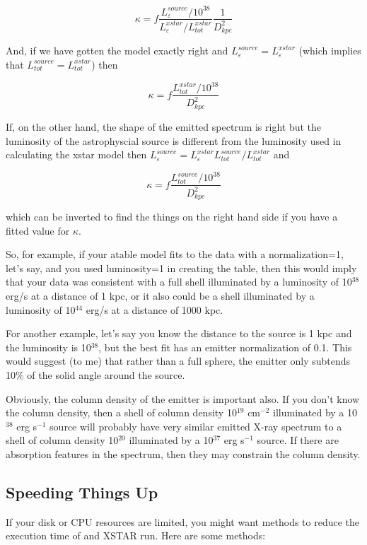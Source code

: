$$\kappa=f \frac{L_\varepsilon^{source}/10^{38}}{L_\varepsilon^{xstar}/L_{tot}^{xstar}} \frac{1}{D_{kpc}^2}$$

And, if we have gotten the model exactly right and $L_\varepsilon^{source}=L_\varepsilon^{xstar}$ 
(which implies that $L_{tot}^{source}=L_{tot}^{xstar}$) then

$$\kappa=f  \frac{L_{tot}^{xstar}/10^{38}}{D_{kpc}^2}$$

If, on the other hand, the shape of the emitted spectrum is right but the luminosity of the astrophyscial source is 
different from the luminosity used in calculating the xstar model then 
$L_\varepsilon^{source}=L_\varepsilon^{xstar} L_{tot}^{source}/L_{tot}^{xstar}$
and 

$$\kappa=f  \frac{L_{tot}^{source}/10^{38}}{ D_{kpc}^2}$$

which can be inverted to find the things on the right hand side if you have a fitted value for $\kappa$.



So, for example, if your atable model fits to the data with a normalization=1, let's say,
and you used luminosity=1 in creating the table, then this would
imply that your data was consistent with a full shell illuminated 
by a luminosity of 10$^{38}$ erg/s at a distance of 1 kpc, 
or it also could be a shell illuminated by a luminosity of 10$^{44}$ erg/s 
at a distance of 1000 kpc.  

For another example, let's say  you know the distance to the source 
is 1 kpc and the luminosity is 10$^{38}$, but the best fit has an emitter 
normalization of 0.1.  This would suggest (to me) that rather than 
a full sphere, the emitter only subtends 10$\%$ of the solid angle around the 
source.  

Obviously, the column density of the emitter is important also.  If you 
don't know the column density, then a shell of column density 10$^{19}$ cm$^{-2}$ 
illuminated by a 10$^{38}$ erg s$^{-1}$ source will probably have very
similar emitted X-ray spectrum to a shell of column density 10$^{20}$ illuminated by a 
10$^{37}$ erg s$^{-1}$ source.  If there are absorption features in the 
spectrum, then they may constrain the column density.


\subsection{Speeding Things Up}

If your disk or CPU resources are limited, you might want methods to 
reduce the execution time of and XSTAR run.  Here are some methods:


